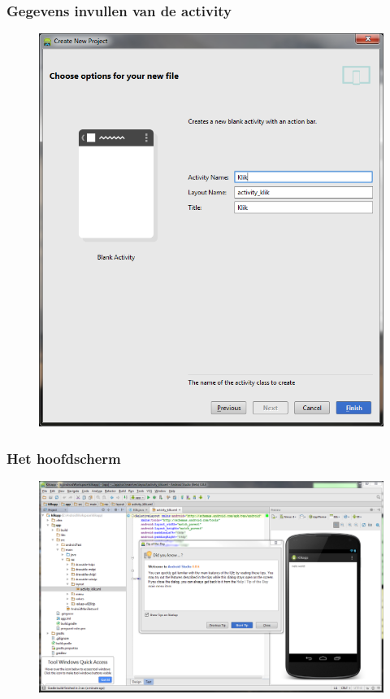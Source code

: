 \documentclass[11pt]{beamer}
\begin{document}
\begin{frame}
\frametitle{Gegevens invullen van de activity}
\begin{figure}
\centering
\includegraphics[height=.9\textheight]{./newproject4}
\label{fig:newproject4}
\end{figure}
\end{frame}


\begin{frame}
\frametitle{Het hoofdscherm}
\begin{figure}
\centering
\includegraphics[width=1.0\linewidth]{./asinterface1}
\label{fig:asinterface1}
\end{figure}
\end{frame}
\end{document}
